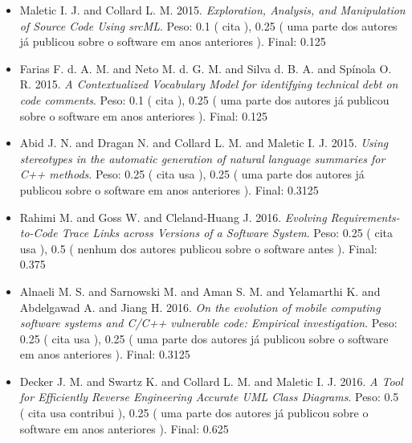 \begin{itemize}
\item Maletic I. J. and Collard L. M.
      2015.
        \textit{ Exploration, Analysis, and Manipulation of Source Code Using srcML}.
      Peso:
      0.1 (
          cita
      ),
      0.25 (
uma parte dos autores já publicou sobre o software em anos anteriores
      ).
      Final:
      0.125

\item Farias F. d. A. M. and Neto M. d. G. M. and Silva d. B. A. and Spínola O. R.
      2015.
        \textit{ A Contextualized Vocabulary Model for identifying technical debt on code comments}.
      Peso:
      0.1 (
          cita
      ),
      0.25 (
uma parte dos autores já publicou sobre o software em anos anteriores
      ).
      Final:
      0.125

\item Abid J. N. and Dragan N. and Collard L. M. and Maletic I. J.
      2015.
        \textit{ Using stereotypes in the automatic generation of natural language summaries for C++ methods}.
      Peso:
      0.25 (
          cita
          usa
      ),
      0.25 (
uma parte dos autores já publicou sobre o software em anos anteriores
      ).
      Final:
      0.3125

\item Rahimi M. and Goss W. and Cleland-Huang J.
      2016.
        \textit{ Evolving Requirements-to-Code Trace Links across Versions of a Software System}.
      Peso:
      0.25 (
          cita
          usa
      ),
      0.5 (
nenhum dos autores publicou sobre o software antes
      ).
      Final:
      0.375

\item Alnaeli M. S. and Sarnowski M. and Aman S. M. and Yelamarthi K. and Abdelgawad A. and Jiang H.
      2016.
        \textit{ On the evolution of mobile computing software systems and C/C++ vulnerable code: Empirical investigation}.
      Peso:
      0.25 (
          cita
          usa
      ),
      0.25 (
uma parte dos autores já publicou sobre o software em anos anteriores
      ).
      Final:
      0.3125

\item Decker J. M. and Swartz K. and Collard L. M. and Maletic I. J.
      2016.
        \textit{ A Tool for Efficiently Reverse Engineering Accurate UML Class Diagrams}.
      Peso:
      0.5 (
          cita
          usa
          contribui
      ),
      0.25 (
uma parte dos autores já publicou sobre o software em anos anteriores
      ).
      Final:
      0.625


\end{itemize}
